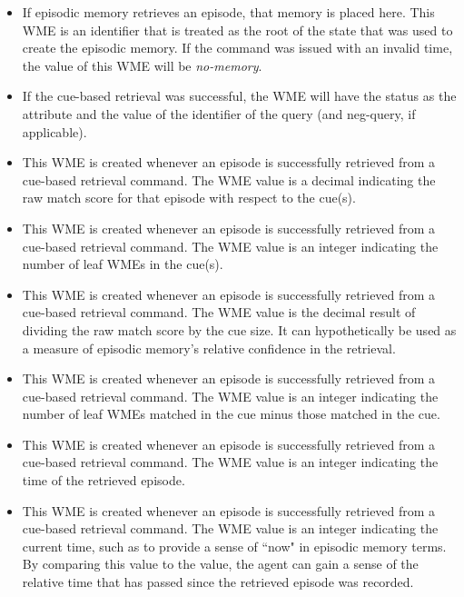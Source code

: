 \begin{itemize}

\item {}
	If episodic memory retrieves an episode, that memory is placed here. This WME is an identifier that is treated as the root of the state that was used to create the episodic memory. If the  command was issued with an invalid time, the value of this WME will be \emph{no-memory}.
\item {}
	If the cue-based retrieval was successful, the WME will have the status as the attribute and the value of the identifier of the query (and neg-query, if applicable).
\item {}
	This WME is created whenever an episode is successfully retrieved from a cue-based retrieval command. The WME value is a decimal indicating the raw match score for that episode with respect to the cue(s).
\item {}
	This WME is created whenever an episode is successfully retrieved from a cue-based retrieval command. The WME value is an integer indicating the number of leaf WMEs in the cue(s).
\item {}
	This WME is created whenever an episode is successfully retrieved from a cue-based retrieval command. The WME value is the decimal result of dividing the raw match score by the cue size. It can hypothetically be used as a measure of episodic memory's relative confidence in the retrieval.
\item {}
	This WME is created whenever an episode is successfully retrieved from a cue-based retrieval command. The WME value is an integer indicating the number of leaf WMEs matched in the  cue minus those matched in the  cue.
\item {}
	This WME is created whenever an episode is successfully retrieved from a cue-based retrieval command. The WME value is an integer indicating the time of the retrieved episode.
\item {}
	This WME is created whenever an episode is successfully retrieved from a cue-based retrieval command. The WME value is an integer indicating the current time, such as to provide a sense of ``now" in episodic memory terms. By comparing this value to the  value, the agent can gain a sense of the relative time that has passed since the retrieved episode was recorded.

\end{itemize}
